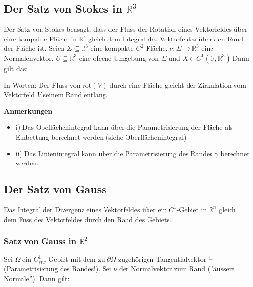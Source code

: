 \documentclass[a4paper, fontsize = 8pt, landscape]{scrartcl}
\newenvironment {annotation}[1]
				{\begin{itshape} \begin{small} \textbf{#1} \begin{itemize}}
				{\end{itemize} \end{small} \end{itshape}}
\newcommand{\eqbox}[1]{\fcolorbox{black}{white}{\hspace{0.5em}#1\hspace{0.5em}}}
\newcommand{\R}[0]{\mathbb{R}}
\begin{document}
\begin{multicols*}{3}
    \subsection{Der Satz von Stokes in $\R^3$}
    Der Satz von Stokes beasagt, dass der Fluss der Rotation eines Vektorfeldes über eine kompakte Fläche in $\R^3$ gleich dem Integral des Vektorfeldes über den Rand der Fläche ist.
    Seien $\Sigma \subseteq \R^3$ eine kompakte $C^2$-Fläche, $\nu: \Sigma \rightarrow \R^3$ eine Normalenvektor, $U \subseteq \R^3$ eine ofeene Umgebung von $\Sigma$ und $X \in C^1(U,\R^3)$.Dann gilt das:
    \begin{center}
        \eqbox{$\displaystyle\int_{\Sigma, \nu} (\nabla \times X) \cdot d\mathbf{A} = \int_{\Sigma} rot(X) \cdot \nu \,d\mu = \int_{\partial \Sigma} X \cdot d\vec{s}$}
    \end{center}
    In Worten: Der Fluss von $\text{rot}(V)$ durch eine Fläche gleicht der Zirkulation vom Vektorfeld $V$ seinem Rand entlang. \\
    \begin{annotation}{Anmerkungen}
        \item[i)] Das Obeflächenintegral kann über die Parametrisierung der Fläche als Einbettung berechnet werden (siehe Oberflächenintegral)
        \item[ii)] Das Linienintegral kann über die Parametrisierung des Randes $\gamma$ berechnet werden.
    \end{annotation}

    \subsection{Der Satz von Gauss}
    Das Integral der Divergenz eines Vektorfeldes über ein $C^1$-Gebiet in $\R^n$ gleich dem Fuss des Vektorfeldes durch den Rand des Gebiets.

    \subsubsection{Satz von Gauss in $\R^2$}
    Sei $\Omega$ ein $C^1_{stw}$ Gebiet mit dem zu $\partial\Omega$ zugehörigen Tangentialvektor $\dot\gamma$ (Parametrisierung des Randes!). Sei $\nu$ der Normalvektor zum Rand (''äussere Normale''). Dann gilt:


\end{multicols*}
\end{document}
